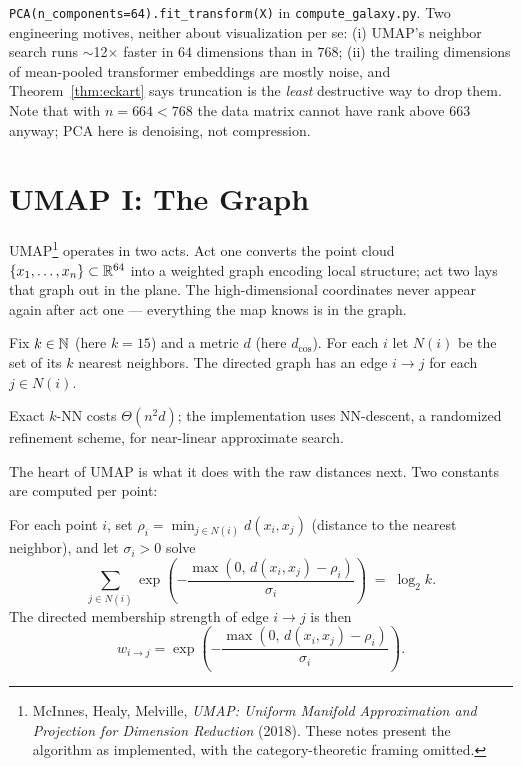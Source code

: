 \begin{incode}
\texttt{PCA(n\_components=64).fit\_transform(X)} in
\texttt{compute\_galaxy.py}. Two engineering motives, neither about
visualization per se: (i) UMAP's neighbor search runs $\sim$12$\times$
faster in $64$ dimensions than in $768$; (ii) the trailing dimensions of
mean-pooled transformer embeddings are mostly noise, and
Theorem~\ref{thm:eckart} says truncation is the \emph{least} destructive way
to drop them. Note that with $n = 664 < 768$ the data matrix cannot have rank
above $663$ anyway; PCA here is denoising, not compression.
\end{incode}

\section{UMAP I: The Graph}

UMAP\footnote{McInnes, Healy, Melville, \emph{UMAP: Uniform Manifold
Approximation and Projection for Dimension Reduction} (2018). These notes
present the algorithm as implemented, with the category-theoretic framing
omitted.} operates in two acts. Act one converts the point cloud
$\{x_1, \dots, x_n\} \subset \mathbb{R}^{64}$ into a weighted graph encoding local
structure; act two lays that graph out in the plane. The high-dimensional
coordinates never appear again after act one --- everything the map knows is
in the graph.

\begin{definition}[$k$-NN graph]\label{def:knn}
Fix $k \in \mathbb{N}$ (here $k = 15$) and a metric $d$ (here $d_{\cos}$). For each
$i$ let $N(i)$ be the set of its $k$ nearest neighbors. The directed graph
has an edge $i \to j$ for each $j \in N(i)$.
\end{definition}

Exact $k$-NN costs $\Theta(n^2 d)$; the implementation uses NN-descent, a
randomized refinement scheme, for near-linear approximate search.

The heart of UMAP is what it does with the raw distances next. Two constants
are computed per point:

\begin{definition}\label{def:rhosigma}
For each point $i$, set $\rho_i = \min_{j \in N(i)} d(x_i, x_j)$ (distance to
the nearest neighbor), and let $\sigma_i > 0$ solve
\begin{equation}\label{eq:sigma}
\sum_{j \in N(i)} \exp\!\left(- \frac{\max(0,\, d(x_i, x_j) - \rho_i)}
{\sigma_i}\right) \;=\; \log_2 k .
\end{equation}
The directed membership strength of edge $i \to j$ is then
\[
w_{i \to j} = \exp\!\left(- \frac{\max(0,\, d(x_i, x_j) - \rho_i)}
{\sigma_i}\right).
\]
\end{definition}

